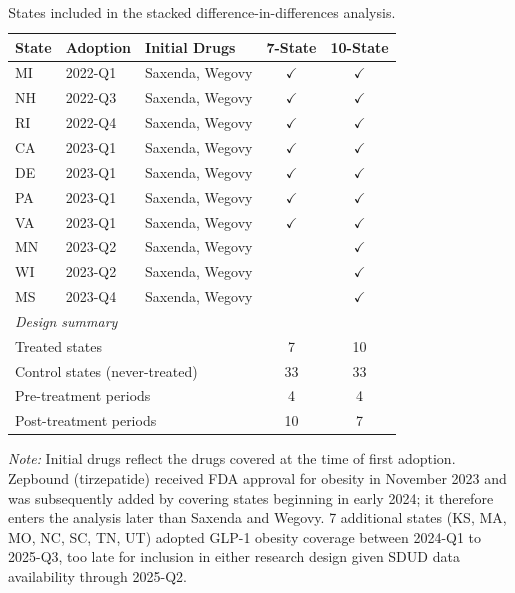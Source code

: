 \begin{table}[!htbp]
  \centering
  \caption{States included in the stacked difference-in-differences analysis.}
  \begin{tabularx}{0.9\textwidth}{llXcc}
    \toprule
    State & Adoption & Initial Drugs & 7-State & 10-State \\
    \midrule
    MI & 2022-Q1 & Saxenda, Wegovy & $\checkmark$ & $\checkmark$ \\
    NH & 2022-Q3 & Saxenda, Wegovy & $\checkmark$ & $\checkmark$ \\
    RI & 2022-Q4 & Saxenda, Wegovy & $\checkmark$ & $\checkmark$ \\
    CA & 2023-Q1 & Saxenda, Wegovy & $\checkmark$ & $\checkmark$ \\
    DE & 2023-Q1 & Saxenda, Wegovy & $\checkmark$ & $\checkmark$ \\
    PA & 2023-Q1 & Saxenda, Wegovy & $\checkmark$ & $\checkmark$ \\
    VA & 2023-Q1 & Saxenda, Wegovy & $\checkmark$ & $\checkmark$ \\
    MN & 2023-Q2 & Saxenda, Wegovy &  & $\checkmark$ \\
    WI & 2023-Q2 & Saxenda, Wegovy &  & $\checkmark$ \\
    MS & 2023-Q4 & Saxenda, Wegovy &  & $\checkmark$ \\
    \midrule
    \multicolumn{3}{l}{\textit{Design summary}} & & \\
    \multicolumn{3}{l}{\quad Treated states} & 7 & 10 \\
    \multicolumn{3}{l}{\quad Control states (never-treated)}  & 33 & 33 \\
    \multicolumn{3}{l}{\quad Pre-treatment periods} & 4 & 4 \\
    \multicolumn{3}{l}{\quad Post-treatment periods} & 10 & 7 \\
    \bottomrule
  \end{tabularx}
  \begin{minipage}{0.9\textwidth}
    \vspace{0.5em}
    \footnotesize \textit{Note:} Initial drugs reflect the drugs covered at the time of first adoption. Zepbound (tirzepatide) received FDA approval for obesity in November 2023 and was subsequently added by covering states beginning in early 2024; it therefore enters the analysis later than Saxenda and Wegovy. 7 additional states (KS, MA, MO, NC, SC, TN, UT) adopted GLP-1 obesity coverage between 2024-Q1 to 2025-Q3, too late for inclusion in either research design given SDUD data availability through 2025-Q2.
  \end{minipage}
  \label{tab:design}
\end{table}
